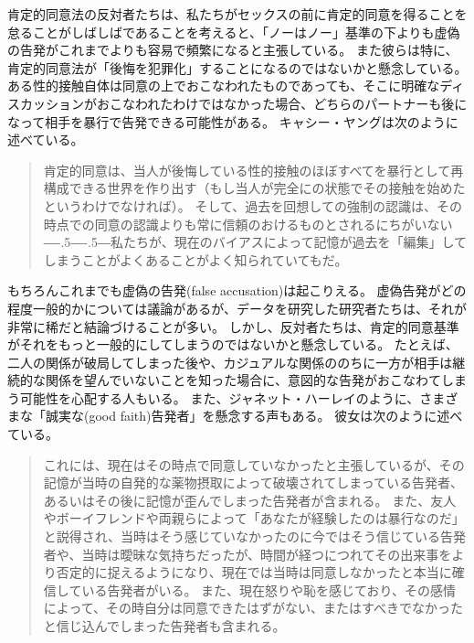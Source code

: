 \documentclass[paper=a4,book,openany]{jlreq}
\def\DDASH{―\kern-.5\zw―\kern-.5\zw―} %
\begin{document}
肯定的同意法の反対者たちは、私たちがセックスの前に肯定的同意を得ることを怠ることがしばしばであることを考えると、「ノーはノー」基準の下よりも虚偽の告発がこれまでよりも容易で頻繁になると主張している。
また彼らは特に、肯定的同意法が「後悔を犯罪化」することになるのではないかと懸念している。
ある性的接触自体は同意の上でおこなわれたものであっても、そこに明確なディスカッションがおこなわれたわけではなかった場合、どちらのパートナーも後になって相手を暴行で告発できる可能性がある。
キャシー・ヤングは次のように述べている。

\begin{quote}
肯定的同意は、当人が後悔している性的接触のほぼすべてを暴行として再構成できる世界を作り出す（もし当人が完全にの状態でその接触を始めたというわけでなければ）。
そして、過去を回想しての強制の認識は、その時点での同意の認識よりも常に信頼のおけるものとされるにちがいない{\DDASH}私たちが、現在のバイアスによって記憶が過去を「編集」してしまうことがよくあることがよく知られていてもだ。
\citep{young15:_femin_want_us_defin_these}
\end{quote}

もちろんこれまでも虚偽の告発(false accusation)は起こりえる。
虚偽告発がどの程度一般的かについては議論があるが、データを研究した研究者たちは、それが非常に稀だと結論づけることが多い\citep{ferguson16:_asses_polic_class_sexual_assaul_repor}。
しかし、反対者たちは、肯定的同意基準がそれをもっと一般的にしてしまうのではないかと懸念している。
たとえば、二人の関係が破局してしまった後や、カジュアルな関係ののちに一方が相手は継続的な関係を望んでいないことを知った場合に、意図的な告発がおこなわてしまう可能性を心配する人もいる。
また、ジャネット・ハーレイのように、さまざまな「誠実な(good faith)告発者」を懸念する声もある。
彼女は次のように述べている。

\begin{quote}
これには、現在はその時点で同意していなかったと主張しているが、その記憶が当時の自発的な薬物摂取によって破壊されてしまっている告発者、あるいはその後に記憶が歪んでしまった告発者が含まれる。
また、友人やボーイフレンドや両親らによって「あなたが経験したのは暴行なのだ」と説得され、当時はそう感じていなかったのに今ではそう信じている告発者や、当時は曖昧な気持ちだったが、時間が経つにつれてその出来事をより否定的に捉えるようになり、現在では当時は同意しなかったと本当に確信している告発者がいる。
また、現在怒りや恥を感じており、その感情によって、その時自分は同意できたはずがない、またはすべきでなかったと信じ込んでしまった告発者も含まれる。
\citep[p.272]{halley16:_move_affir_consen}
\end{quote}
\end{document}
